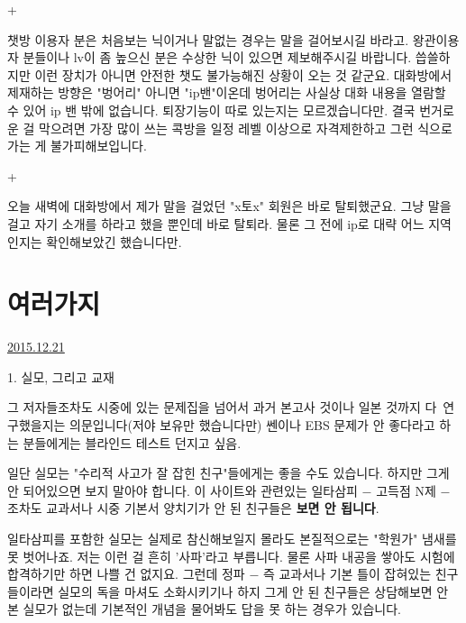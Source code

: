+
\vspace{5mm}

챗방 이용자 분은 처음보는 닉이거나 말없는 경우는 말을 걸어보시길 바라고.
왕관이용자 분들이나 lv이 좀 높으신 분은 수상한 닉이 있으면 제보해주시길 바랍니다.
씁쓸하지만 이런 장치가 아니면 안전한 챗도 불가능해진 상황이 오는 것 같군요.
대화방에서 제재하는 방향은 "벙어리" 아니면 "ip밴"이온데
벙어리는 사실상 대화 내용을 열람할 수 있어 ip 밴 밖에 없습니다. 퇴장기능이 따로 있는지는 모르겠습니다만.
결국 번거로운 걸 막으려면 가장 많이 쓰는 콕방을 일정 레벨 이상으로 자격제한하고 그런 식으로 가는 게 불가피해보입니다.
\vspace{5mm}

+
\vspace{5mm}

오늘 새벽에 대화방에서 제가 말을 걸었던 "x토x" 회원은 바로 탈퇴했군요.
그냥 말을 걸고 자기 소개를 하라고 했을 뿐인데 바로 탈퇴라.
물론 그 전에 ip로 대략 어느 지역인지는 확인해보았긴 했습니다만.
\vspace{5mm}






\section{여러가지}
\href{https://www.kockoc.com/Apoc/556008}{2015.12.21}

\vspace{5mm}

\item 1. 실모, 그리고 교재
\vspace{5mm}

그 저자들조차도 시중에 있는 문제집을 넘어서 과거 본고사 것이나 일본 것까지 다 연구했을지는 의문입니다(저야 보유만 했습니다만)
쎈이나 EBS 문제가 안 좋다라고 하는 분들에게는 블라인드 테스트 던지고 싶음.
\vspace{5mm}

일단 실모는 "수리적 사고가 잘 잡힌 친구"들에게는 좋을 수도 있습니다. 하지만 그게 안 되어있으면 보지 말아야 합니다.
이 사이트와 관련있는 일타삼피 $-$ 고득점 N제 $-$ 조차도 교과서나 시중 기본서 양치기가 안 된 친구들은 \textbf{보면 안 됩니다}.
\vspace{5mm}

일타삼피를 포함한 실모는 실제로 참신해보일지 몰라도 본질적으로는 "학원가" 냄새를 못 벗어나죠.
저는 이런 걸 흔히 '사파'라고 부릅니다. 물론 사파 내공을 쌓아도 시험에 합격하기만 하면 나쁠 건 없지요.
그런데 정파 $-$ 즉 교과서나 기본 틀이 잡혀있는 친구들이라면 실모의 독을 마셔도 소화시키기나 하지
그게 안 된 친구들은 상담해보면 안 본 실모가 없는데 기본적인 개념을 물어봐도 답을 못 하는 경우가 있습니다.
\vspace{5mm}

